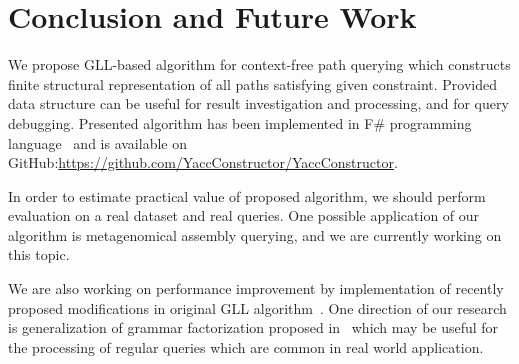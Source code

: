 \section{Conclusion and Future Work}

We propose GLL-based algorithm for context-free path querying which constructs finite structural representation of all paths satisfying given constraint.
Provided data structure can be useful for result investigation and processing, and for query debugging.
Presented algorithm has been implemented in F\# programming language~\cite{FSharp} and is available on GitHub:\url{https://github.com/YaccConstructor/YaccConstructor}.

In order to estimate practical value of proposed algorithm, we should perform evaluation on a real dataset and real queries.
One possible application of our algorithm is metagenomical assembly querying, and we are currently working on this topic.

We are also working on performance improvement by implementation of recently proposed modifications in original GLL algorithm~\cite{FGLL,FastPracticalGLL}.
One direction of our research is generalization of grammar factorization proposed in~\cite{FGLL} which may be useful for the processing of regular queries which are common in real world application.

